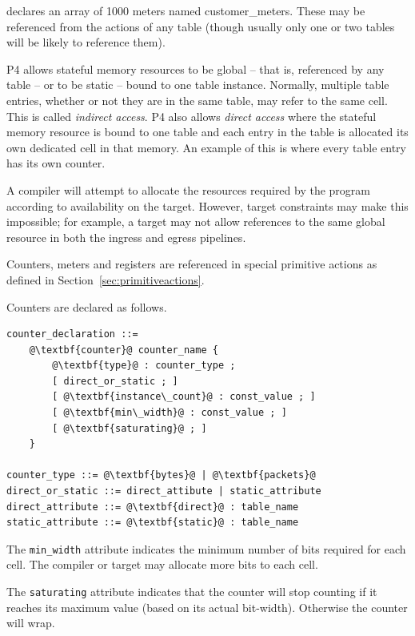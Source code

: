 \documentclass[12pt]{article}
\begin{document}
declares an array of 1000 meters named customer_meters. These may be referenced 
from the actions of any table (though usually only one or two tables will 
be likely to reference them).

P4 allows stateful memory resources to be global -- that is, referenced by 
any table -- or to be static -- bound to one table instance. Normally, multiple 
table entries, whether or not they are in the same table, may refer to the 
same cell. This is called \textit{indirect access}. P4 also allows \textit{direct access} where 
the stateful memory resource is bound to one table and each entry in the table 
is allocated its own dedicated cell in that memory. An example of this is 
where every table entry has its own counter.

A compiler will attempt to allocate the resources required by the program 
according to availability on the target. However, target constraints may make 
this impossible; for example, a target may not allow references to the same 
global resource in both the ingress and egress pipelines.

{\color{red} Counters, meters and registers are referenced in special primitive actions as defined 
in Section~\ref{sec:primitiveactions}.}


Counters are declared as follows.

\begin{lstlisting}[frame=single,backgroundcolor=\color{bnfgreen},escapechar=\@]
counter_declaration ::= 
    @\textbf{counter}@ counter_name {
        @\textbf{type}@ : counter_type ;
        [ direct_or_static ; ]
        [ @\textbf{instance\_count}@ : const_value ; ]
        [ @\textbf{min\_width}@ : const_value ; ]
        [ @\textbf{saturating}@ ; ]
    }

counter_type ::= @\textbf{bytes}@ | @\textbf{packets}@
direct_or_static ::= direct_attibute | static_attribute
direct_attribute ::= @\textbf{direct}@ : table_name
static_attribute ::= @\textbf{static}@ : table_name
\end{lstlisting}


The \texttt{min_width} attribute indicates the minimum number of bits
required for each cell.  The compiler or target may allocate more bits
to each cell.

The \texttt{saturating} attribute indicates that the counter will stop
counting if it reaches its maximum value (based on its actual
bit-width). Otherwise the counter will wrap.
\end{document}
